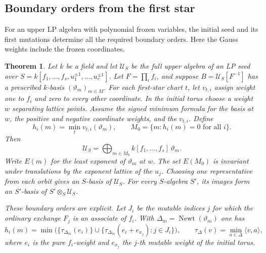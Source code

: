 \documentclass[11pt,reqno]{amsart}
\numberwithin{equation}{section}
\newtheorem{theorem}{Theorem}[section]
\theoremstyle{definition}
\theoremstyle{remark}
\DeclareMathOperator{\Newt}{Newt}
\begin{document}
\subsection{Boundary orders from the first star}

For an upper LP algebra with polynomial frozen variables, the initial
seed and its first mutations determine all the required boundary
orders. Here the Gauss weights include the frozen coordinates.

\begin{theorem}\label{thm:polynomial-star-descent}
Let \(k\) be a field and let \(\mathcal U_S\) be the full upper
algebra of an LP seed over
\(S=k[f_1,\ldots,f_s,u_1^{\pm1},\ldots,u_c^{\pm1}]\).
Let \(F=\prod_i f_i\), and suppose
\(B=\mathcal U_S[F^{-1}]\) has a prescribed \(k\)-basis
\((\vartheta_m)_{m\in M}\). For each first-star chart \(t\), let
\(v_{t,i}\) assign weight one to \(f_i\) and zero to every other
coordinate. In the initial torus choose a weight \(w\) separating
lattice points. Assume the signed minimum formula for the basis at
\(w\), the positive and negative coordinate weights, and the
\(v_{t,i}\). Define
\[ h_i(m)=\min_t v_{t,i}(\vartheta_m),\qquad M_0=\{m:h_i(m)=0\text{ for all }i\}. \]
Then
\[ \mathcal U_S=\bigoplus_{m\in M_0}k[f_1,\ldots,f_s]\,\vartheta_m . \]
Write \(E(m)\) for the least exponent of \(\vartheta_m\) at \(w\).
The set \(E(M_0)\) is invariant under translations by the exponent
lattice of the \(u_j\). Choosing one representative from each orbit
gives an \(S\)-basis of \(\mathcal U_S\). For every \(S\)-algebra \(S'\),
its images form an \(S'\)-basis of \(S'\otimes_S\mathcal U_S\).

These boundary orders are explicit. Let \(J_i\) be the mutable
indices \(j\) for which the ordinary exchange \(F_j\) is an
associate of \(f_i\). With \(\Delta_m=\Newt(\vartheta_m)\) one has
\[ h_i(m)=\min\bigl(\{\tau_{\Delta_m}(e_i)\}\cup \{\tau_{\Delta_m}(e_i+e_{x_j}):j\in J_i\}\bigr), \qquad \tau_\Delta(v)=\min_{a\in\Delta}\langle v,a\rangle , \]
where \(e_i\) is the pure \(f_i\)-weight and \(e_{x_j}\) the
\(j\)-th mutable weight of the initial torus.
\end{theorem}
\end{document}
